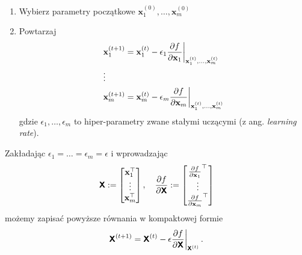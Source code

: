 \documentclass{myclass}
\begin{document}
\begin{tcolorbox}[title=Algorytm spadku wzdłuż gradientu]
\begin{enumerate}
    \item Wybierz parametry początkowe \(\mathbf{x}_1^{(0)}, \ldots, \mathbf{x}_m^{(0)}\)
    \item Powtarzaj
    \begin{equation*}
        \begin{split}
            &\mathbf{x}_1^{(t+1)} = \mathbf{x}_1^{(t)} - \epsilon_1\pdv{f}{\mathbf{x}_1}\bigg|_{\mathbf{x}_1^{(t)}, \ldots, \mathbf{x}_m^{(t)}}\\
            &\vdots\\
            &\mathbf{x}_m^{(t+1)} = \mathbf{x}_m^{(t)} - \epsilon_m\pdv{f}{\mathbf{x}_m}\bigg|_{\mathbf{x}_1^{(t)}, \ldots, \mathbf{x}_m^{(t)}}
        \end{split}
    \end{equation*}
    gdzie \(\epsilon_1,\ldots,\epsilon_m\) to hiper-parametry zwane stałymi uczącymi (z ang.
    \textit{learning rate}).
\end{enumerate}
\end{tcolorbox}

Zakładając \(\epsilon_1 = \ldots = \epsilon_m = \epsilon\) i wprowadzając
\begin{equation*}
    \oper{X} := \mqty[\mathbf{x}_1^\top \\ \vdots \\ \mathbf{x}_m^\top]\,,\quad \pdv{f}{\oper{X}} := \mqty[\pdv{f}{\mathbf{x}_1}^\top \\ \vdots \\ \pdv{f}{\mathbf{x}_m}^\top]
\end{equation*}
możemy zapisać powyższe równania w kompaktowej formie
\begin{equation*}
    \boldsymbol{\mathsf{X}}^{(t+1)} = \boldsymbol{\mathsf{X}}^{(t)} - \epsilon \pdv{f}{\boldsymbol{\mathsf{X}}}\bigg|_{\boldsymbol{\mathsf{X}}^{(t)}}\,.
\end{equation*}
\end{document}
